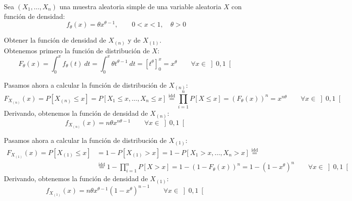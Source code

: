 \begin{ejercicio}[Reto]
    Sea $(X_1, \ldots, X_n)$ una muestra aleatoria simple de una variable aleatoria $X$ con función de densidad:
    \begin{equation*}
        f_\theta(x) = \theta x^{\theta-1}, \qquad 0<x<1, \quad \theta>0
    \end{equation*}

    Obtener la función de densidad de $X_{(n)}$ y de $X_{(1)}$.\\

    Obtenemos primero la función de distribución de $X$:
    \begin{equation*}
        F_\theta(x) = \int_{0}^{x} f_\theta(t)~dt = \int_{0}^{x} \theta t^{\theta-1}~dt = \left[t^\theta\right]_0^x = x^\theta \qquad \forall x\in \left]0,1\right[
    \end{equation*}

    Pasamos ahora a calcular la función de distribución de $X_{(n)}$:
    \begin{equation*}
        F_{X_{(n)}}(x) = P[X_{(n)} \leq x] = P[X_1 \leq x, \ldots, X_n \leq x] \stackrel{\text{idd}}{=} \prod_{i=1}^{n} P[X \leq x] = {(F_\theta(x))}^{n} = x^{n\theta} \qquad \forall x\in \left]0,1\right[
    \end{equation*}
    Derivando, obtenemos la función de densidad de $X_{(n)}$:
    \begin{equation*}
        f_{X_{(n)}}(x) = n\theta x^{n\theta-1} \qquad \forall x\in \left]0,1\right[
    \end{equation*}

    Pasamos ahora a calcular la función de distribución de $X_{(1)}$:
    \begin{align*}
        F_{X_{(1)}}(x) = P[X_{(1)} \leq x] &= 1 - P[X_{(1)} > x] = 1 - P[X_1 > x, \ldots, X_n > x] \stackrel{\text{idd}}{=} 
        \\&\stackrel{\text{idd}}{=} 1 - \prod_{i=1}^{n} P[X > x] = 1 - {(1-F_\theta(x))}^{n} = 1 - {(1-x^\theta)}^{n} \qquad \forall x\in \left]0,1\right[
    \end{align*}
    Derivando, obtenemos la función de densidad de $X_{(1)}$:
    \begin{equation*}
        f_{X_{(1)}}(x) = n\theta x^{\theta-1} {(1-x^\theta)}^{n-1} \qquad \forall x\in \left]0,1\right[
    \end{equation*}
\end{ejercicio}


